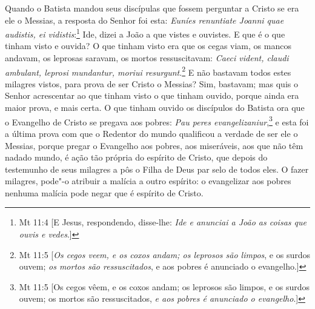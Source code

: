 Quando o Batista mandou seus discípulas que fossem perguntar a Cristo se
era ele o Messias, a resposta do Senhor foi esta: \emph{Euníes
renuntiate Joanni quae audistis, ei vidistis}:\footnote{Mt 11:4 [E Jesus, respondendo, disse-lhe: \emph{Ide e anunciai a João as coisas que ouvis e vedes}.]} Ide, dizei a
João a que vistes e ouvistes. E que é o que tinham visto e ouvida? O
que tinham visto era que os cegas viam, os mancos andavam, os leprosas
saravam, os mortos ressuscitavam: \emph{Caeci vident, claudi ambulant,
leprosi mundantur, moriui resurgunt}.\footnote{Mt 11:5 [\emph{Os cegos veem, e os coxos andam; os leprosos são limpos}, e os surdos ouvem; \emph{os mortos
são ressuscitados}, e aos pobres é anunciado o evangelho.]} E não bastavam todos
estes milagres vistos, para prova de ser Cristo o Messias? Sim,
bastavam; mas quis o Senhor acrescentar ao que tinham visto o que tinham
ouvido, porque ainda era maior prova, e mais certa. O que tinham ouvido
os discípulos do Batista ora que o Evangelho de Cristo se pregava aos
pobres: \emph{Pau peres evangelizaniur},\footnote{Mt 11:5 [Os cegos vêem, e os coxos andam; os leprosos são limpos, e os surdos ouvem; os mortos
são ressuscitados, \emph{e aos pobres é anunciado o evangelho}.]} e esta foi a última
prova com que o Redentor do mundo qualificou a verdade de ser ele o
Messias, porque pregar o Evangelho aos pobres, aos miseráveis, aos que
não têm nadado mundo, é ação tão própria do espírito de Cristo, que
depois do testemunho de seus milagres a pôs o Filha de Deus par selo de
todos eles. O fazer milagres, pode"-o atribuir a malícia a outro
espírito: o evangelizar aos pobres nenhuma malícia pode negar que é
espírito de Cristo.

